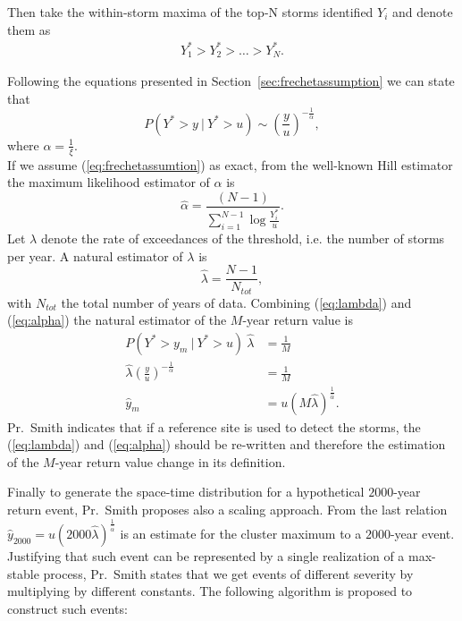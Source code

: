 Then take the within-storm maxima of the top-N storms identified $Y_i$ and denote them as
\begin{align*}
Y^*_1 > Y^*_2 > \ldots > Y^*_N.
\end{align*}

Following the equations presented in Section~\ref{sec:frechetassumption} we can state that 
\begin{equation}
\label{eq:frechetassumtion}
P(Y^* > y \: | \: Y^* > u) \sim \left( \frac{y}{u} \right) ^{-\frac{1}{\alpha}},
\end{equation}
where $\alpha = \frac{1}{\xi}$. \\
If we assume (\ref{eq:frechetassumtion}) as exact, from the well-known Hill estimator the maximum likelihood estimator of $\alpha$ is
\begin{equation}
\label{eq:alpha}
\hat{\alpha} = \frac{(N - 1)} { \sum\limits_{i=1}^{N-1} \log{\frac{Y^*_i}{u}}}.
\end{equation}
Let $\lambda$ denote the rate of exceedances of the threshold, i.e. the number of storms per year. A natural estimator of $\lambda$ is 
\begin{equation}
\label{eq:lambda}
\hat{\lambda} = \frac{N-1}{N_{tot}},
\end{equation}
with $N_{tot}$ the total number of years of data.
Combining (\ref{eq:lambda}) and (\ref{eq:alpha}) the natural estimator of the $M$-year return value is
\begin{align*}
P(Y^* > y_m \: | \: Y^* > u) \: \hat{\lambda} &= \frac{1}{M} \\
\hat{\lambda} \left( \frac{y}{u} \right) ^{-\frac{1}{\alpha}} &= \frac{1}{M} \\
\hat{y}_m &= u \left( M \hat{\lambda} \right)^\frac{1}{\hat{\alpha}}.
\end{align*}
{\color{red} Pr.~Smith indicates that if a reference site is used to detect the storms, the (\ref{eq:lambda}) and (\ref{eq:alpha}) should be re-written and therefore the estimation of the $M$-year return value change in its definition.}

Finally to generate the space-time distribution for a hypothetical $2000$-year return event, Pr.~Smith proposes also a scaling approach. From the last relation $\hat{y}_{2000} = u \left( 2000 \hat{\lambda} \right)^\frac{1}{\hat{\alpha}}$ is an estimate for the cluster maximum to a $2000$-year event.\\
Justifying that such event can be represented by a single realization of a max-stable process, Pr.~Smith states that we get events of different severity by multiplying by different constants. The following algorithm is proposed to construct such events:


